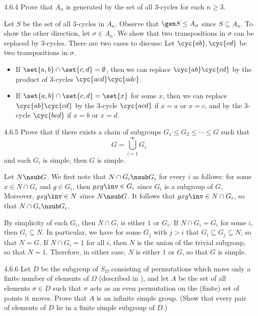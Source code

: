 \begin{exercise}{4.6.4}
	Prove that $A_n$ is generated by the set of all 3-cycles for each $n \geq 3$.
\end{exercise}

\begin{sol}
	Let $S$ be the set of all 3-cycles in $A_n$.
	Observe that $\gen S \leq A_n$ since $S \subseteq A_n$.
	To show the other direction, let $\sigma \in A_n$.
	We show that two transpositions in $\sigma$ can be replaced by 3-cycles.
	There are two cases to discuss: Let $\cyc{a b}, \cyc{c d}$ be two transpositions in $\sigma$.
	\begin{itemize}
		\item If $\set{a, b} \cap \set{c, d} = \emptyset$, then we can replace $\cyc{a b}\cyc{c d}$ by the product of 3-cycles $\cyc{a c d}\cyc{a d c}$.
		\item If $\set{a, b} \cap \set{c, d} = \set{x}$ for some $x$, then we can replace $\cyc{a b}\cyc{c d}$ by the 3-cycle $\cyc{a c d}$ if $x = a$ or $x = c$, and by the 3-cycle $\cyc{b c d}$ if $x = b$ or $x = d$.
	\end{itemize}
\end{sol}

\begin{exercise}{4.6.5}
	Prove that if there exists a chain of subgroups $G_1 \leq G_2 \leq \cdots \leq G$ such that
	\[
		G = \bigcup_{i = 1}^\infty G_i
	\]
	and each $G_i$ is simple, then $G$ is simple.
\end{exercise}

\begin{sol}
	Let $N \nsub G$.
	We first note that $N \cap G_i \nsub G_i$ for every $i$ as follows: for some $x \in N \cap G_i$ and $g \in G_i$, then $gxg\inv \in G_i$ since $G_i$ is a subgroup of $G$.
	Moreover, $gxg\inv \in N$ since $N \nsub G$.
	It follows that $gxg\inv \in N \cap G_i$, so that $N \cap G_i \nsub G_i$.

	By simplicity of each $G_i$, then $N \cap G_i$ is either $1$ or $G_i$.
	If $N \cap G_i = G_i$ for some $i$, then $G_i \subseteq N$.
	In particular, we have for some $G_j$ with $j > i$ that $G_i \subseteq G_j \subseteq N$, so that $N = G$.
	If $N \cap G_i = 1$ for all $i$, then $N$ is the union of the trivial subgroup, so that $N = 1$.
	Therefore, in either case, $N$ is either $1$ or $G$, so that $G$ is simple.
\end{sol}

\begin{exercise}{4.6.6}
	Let $D$ be the subgroup of $S_\Omega$ consisting of permutations which move only a finite number of elements of $\Omega$ (described in ), and let $A$ be the set of all elements $\sigma \in D$ such that $\sigma$ acts as an even permutation on the (finite) set of points it moves.
	Prove that $A$ is an infinite simple group. (Show that every pair of elements of $D$ lie in a finite simple subgroup of $D$.)
\end{exercise}

